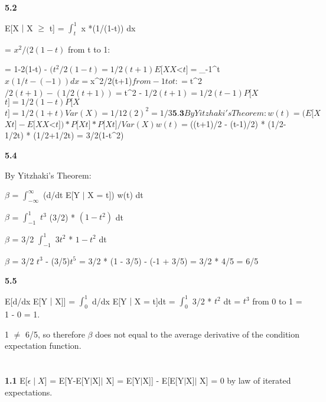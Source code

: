 \textbf{5.2}

E[X $\mid$ X $\geq$ t] = $\int_{t}^{1}$ x *(1/(1-t)) dx 

= $x^{2}/(2(1-t)$ from t to 1: 

= 1-2(1-t) - $(t^{2}/2(1-t) = 1/2(t+1)

E[X $\mid$ X $<$ t] = $\int_{-1}^{t}$ x(1/t-(-1)) dx = $x^{2}/2(t+1)$ from -1 to t:

= $t^{2}$/2(t+1) - (1/2(t+1)) = $t^{2} - 1$/2(t+1) = 1/2(t-1)

P[X $\geq$ t] = 1/2(1-t)

P[X $\leq$ t] = 1/2(1+t)

Var(X) = 1/12(2)^2 = 1/3
 
\textbf{5.3}

By Yitzhaki's Theorem:

w(t) = (E[X $\mid$ X $\geq$ t] - E[X $\mid$ X $<$ t]) * P[X $\geq$ t] * P[X $\leq$ t] / Var(X)

w(t) = $((t+1)/2 - (t-1)/2) * (1/2-1/2t) * (1/2+1/2t) = 3/2(1-t^{2}) 

\textbf{5.4}

By Yitzhaki's Theorem:

$\beta$ = $\int_{-\infty}^{\infty}$ (d/dt E[Y $\mid$ X = t]) w(t) dt

$\beta$ = $\int_{-1}^{1}$ $t^{3}$ (3/2) * $(1 - t^{2})$ dt

$\beta$ = 3/2 $\int_{-1}^{1}$ $3t^{2}$ * $1 - t^{2}$ dt

$\beta$ = 3/2 $t^{3}$ - (3/5)$t^{5}$ = 3/2 * (1 - 3/5) - (-1 + 3/5) = 3/2 * 4/5 = 6/5

\textbf{5.5}

E[d/dx E[Y $\mid$ X]] = $\int_{0}^{1}$ d/dx E[Y $\mid$ X = t]dt =  $\int_{0}^{1}$ 3/2 * $t^2$ dt = $t^{3}$ from 0 to 1 = 1 - 0 = 1.

1 $\neq$ 6/5, so therefore $\beta$ does not equal to the average derivative of the condition expectation function.

\section{}
\textbf{1.1}
E[$\epsilon \mid X]$ = E[Y-E[Y$\mid$X]$\mid$ X] = E[Y$\mid$X]] - E[E[Y$\mid$X]$\mid$ X] = 0 by law of iterated expectations.
